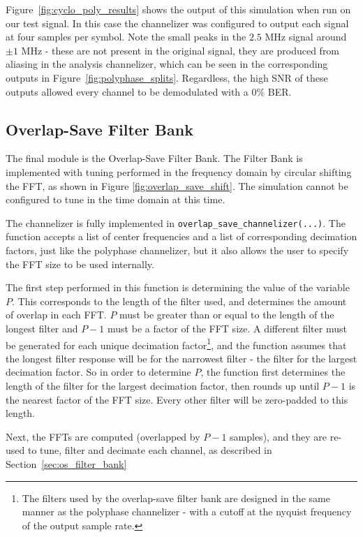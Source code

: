 \documentclass[12pt]{article}
\begin{document}
Figure~\ref{fig:cyclo_poly_results} shows the output of this simulation when
run on our test signal. In this case the channelizer was configured to output
each signal at four samples per symbol. Note the small peaks in the $2.5$ MHz
signal around $\pm1$ MHz - these are not present in the original signal, they
are produced from aliasing in the analysis channelizer, which can be seen in
the corresponding outputs in Figure~\ref{fig:polyphase_splits}. Regardless, the
high SNR of these outputs allowed every channel to be demodulated with a 0\%
BER.

\subsection{Overlap-Save Filter Bank}
\label{sec:sim_os}
The final module is the Overlap-Save Filter Bank. The Filter Bank is
implemented with tuning performed in the frequency domain by circular shifting
the FFT, as shown in Figure \ref{fig:overlap_save_shift}. The
simulation cannot be configured to tune in the time domain at this time.

The channelizer is fully implemented in \texttt{overlap\_save\_channelizer(...)}.
The function accepts a list of center frequencies and a list of corresponding decimation factors, just like the polyphase channelizer, but it also allows the user to specify the FFT size to be used internally.

The first step performed in this function is determining the value of the
variable $P$. This corresponds to the length of the filter used, and determines
the amount of overlap in each FFT. $P$ must be greater than or equal to the
length of the longest filter and $P-1$ must be a factor of the FFT size.
A different filter must be generated for each unique decimation
factor\footnote{The filters used by the overlap-save filter bank are designed
    in the same manner as the polyphase channelizer - with a cutoff at the
nyquist frequency of the output sample rate.}, and the function assumes that
the longest filter response will be for the narrowest filter - the filter for
the largest decimation factor. So in order to determine $P$, the function first
determines the length of the filter for the largest decimation factor, then
rounds up until $P-1$ is the nearest factor of the FFT size. Every other filter
will be zero-padded to this length.

Next, the FFTs are computed (overlapped by $P-1$ samples), and they are re-used
to tune, filter and decimate each channel, as described in
Section~\ref{sec:os_filter_bank}
\end{document}
